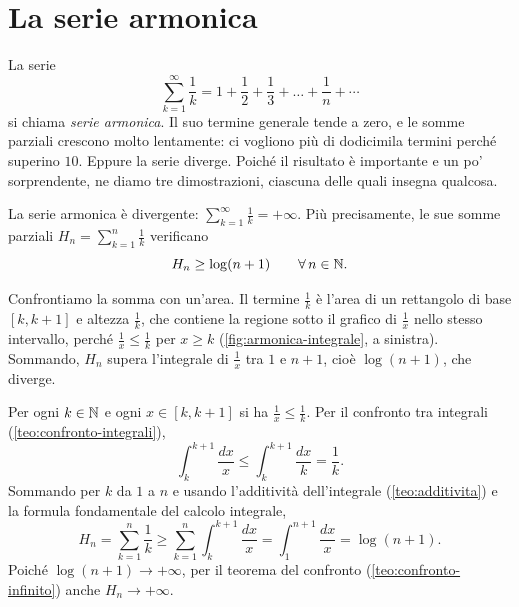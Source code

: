 \section{La serie armonica}
\label{sec:serie-armonica}

La serie
\begin{equation}\label{eq:serie-armonica}
  \sum_{k=1}^{\infty}\frac1k=1+\frac12+\frac13+\dots+\frac1n+\cdots
\end{equation}
si chiama \emph{serie armonica}. Il suo termine generale tende a zero,
e le somme parziali crescono molto lentamente: ci vogliono più di dodicimila termini
perché superino $10$. Eppure la serie diverge. Poiché il risultato è importante e un po'
sorprendente, ne diamo tre dimostrazioni, ciascuna delle quali insegna qualcosa.

\begin{teorema}\label{teo:armonica}
La serie armonica è divergente: $\sum_{k=1}^{\infty}\frac1k=+\infty$. Più precisamente, le sue
somme parziali $H_{n}=\sum_{k=1}^{n}\frac1k$ verificano
\begin{equation}\label{eq:armonica-log}
  H_{n}\ge\log(n+1) \qquad\forall\, n\in\mathbb{N} .
\end{equation}
\end{teorema}

\begin{schema}
\end{schema}

\begin{strategia}
Confrontiamo la somma con un'area. Il termine $\frac1k$ è l'area di un rettangolo di base
$[k,k+1]$ e altezza $\frac1k$, che contiene la regione sotto il grafico di $\frac1x$ nello stesso
intervallo, perché $\frac1x\le\frac1k$ per $x\ge k$ (\cref{fig:armonica-integrale}, a sinistra).
Sommando, $H_{n}$ supera l'integrale di $\frac1x$ tra $1$ e $n+1$, cioè $\log(n+1)$, che diverge.
\end{strategia}

\begin{dimostrazione}
Per ogni $k\in\mathbb{N}$ e ogni $x\in[k,k+1]$ si ha $\frac1x\le\frac1k$. Per il confronto tra integrali
(\cref{teo:confronto-integrali}),
\begin{equation}\label{eq:armonica-rettangolo}
  \int_{k}^{k+1}\frac{dx}x\le\int_{k}^{k+1}\frac{dx}k=\frac1k .
\end{equation}
Sommando per $k$ da $1$ a $n$ e usando l'additività dell'integrale (\cref{teo:additivita})
e la formula fondamentale del calcolo integrale,
\[
  H_{n}=\sum_{k=1}^{n}\frac1k\ge\sum_{k=1}^{n}\int_{k}^{k+1}\frac{dx}x=\int_{1}^{n+1}\frac{dx}x=\log(n+1) .
\]
Poiché $\log(n+1)\to+\infty$, per il teorema del confronto (\cref{teo:confronto-infinito})
anche $H_{n}\to+\infty$.
\end{dimostrazione}

